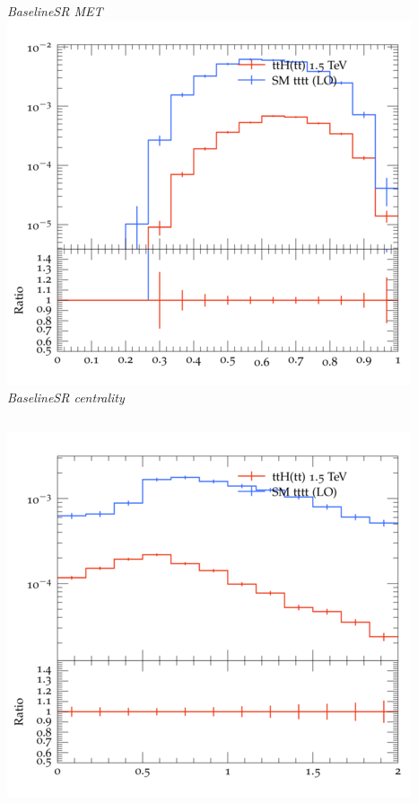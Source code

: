 \documentclass{beamer}
\begin{document}
\begin{frame}
\begin{columns}
\textit{\small BaselineSR MET}
\includegraphics[width=\textwidth]{../plots/ttH_1500/tttt_ttH_1LOS/BaselineSR_centrality.png}\\
\textit{\small BaselineSR centrality}
\end{columns}
\begin{columns}
\includegraphics[width=\textwidth]{../plots/ttH_1500/tttt_ttH_1LOS/BaselineSR_deltaR_bl_min.png}\\

\end{columns}
\end{frame}
\end{document}
